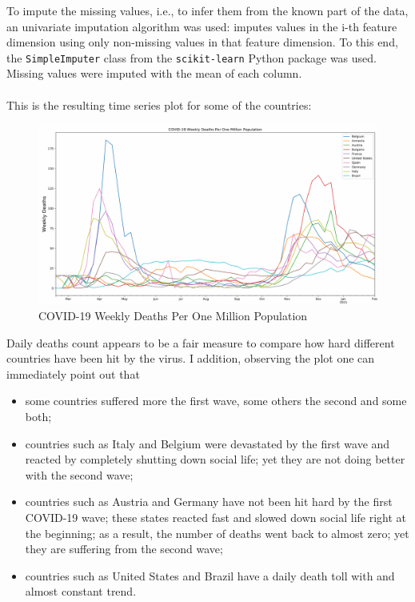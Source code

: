 \documentclass[11pt,a4paper]{article}
\begin{document}
To impute the missing values, i.e., to infer them from the known part of the
data, an univariate imputation algorithm was used: imputes values in the
i-th feature dimension using only non-missing values in that feature dimension.
To this end, the \texttt{SimpleImputer} class from the \texttt{scikit-learn}
Python package was used. Missing values were imputed with the mean of each
column.\\
\\
This is the resulting time series plot for some of the countries:
\begin{figure}[H]
    \begin{center}
        \hspace*{-1.7cm}
        \includegraphics[scale=0.46]{img/weekly-deaths.pdf}
    \end{center}
    \caption{COVID-19 Weekly Deaths Per One Million Population}
\end{figure}
\noindent Daily deaths count appears to be a fair measure to compare how hard
different countries have been hit by the virus. I addition, observing the plot
one can immediately point out that
\begin{itemize}
    \item some countries suffered more the first wave, some others the second
    and some both;
    \item countries such as {\color{ts_italy}Italy} and
    {\color{ts_belgium}Belgium} were devastated by the first wave and reacted
    by completely shutting down social life; yet they are not doing better with
    the second wave;
    \item countries such as {\color{ts_austria}Austria} and
    {\color{ts_germany}Germany} have not been hit hard by the first COVID-19
    wave; these states reacted fast and slowed down social life right at the
    beginning; as a result, the number of deaths went back to almost zero; yet
    they are suffering from the second wave;
    \item countries such as {\color{ts_unitedstates}United States} and
    {\color{cyan}Brazil} have a daily death toll with and almost constant
    trend.
\end{itemize}
\end{document}
